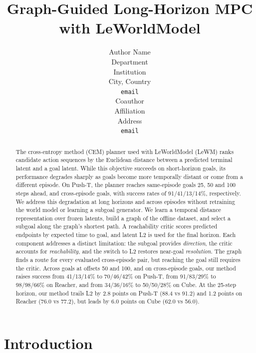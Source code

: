 \documentclass{article} %
\title{Graph-Guided Long-Horizon MPC with LeWorldModel}
\author{Author Name \\
Department \\
Institution \\
City, Country \\
\texttt{email} \\
\And
Coauthor \\
Affiliation \\
Address \\
\texttt{email}
}
\newcommand{\keypoints}[1]{\par\medskip\noindent\fcolorbox{black!50}{black!5}{\begin{minipage}{0.96\linewidth}\small
\textbf{Key points this section must land.}\begin{itemize}[nosep,leftmargin=1.2em]#1\end{itemize}\end{minipage}}\par\medskip}
\begin{document}
\maketitle

\begin{abstract}
The cross-entropy method (CEM) planner used with LeWorldModel (LeWM) ranks candidate action
sequences by the Euclidean distance between a predicted terminal latent and a goal latent. While
this objective succeeds on short-horizon goals, its performance degrades sharply as goals become
more temporally distant or come from a different episode. On Push-T, the planner reaches
same-episode goals 25, 50 and 100 steps ahead, and cross-episode goals, with success rates of
91/41/13/14\%, respectively. We address this degradation at long horizons and across episodes
without retraining the world model or learning a subgoal generator. We learn a temporal
distance representation over frozen latents, build a graph of the offline dataset, and select a subgoal along the graph's shortest path. A reachability critic scores predicted endpoints by expected time to goal, and latent L2 is used for the final horizon. Each component addresses a distinct limitation: the subgoal provides \emph{direction}, the critic accounts for \emph{reachability}, and the switch to L2 restores near-goal \emph{resolution}. The graph finds a route for every evaluated cross-episode pair, but reaching the goal still requires the critic.
Across goals at offsets 50 and 100, and on cross-episode goals, our method raises success from 41/13/14\% to 70/46/42\% on Push-T,
from 91/83/29\% to 98/98/66\% on Reacher, and from 34/36/16\% to 50/50/28\% on Cube. At the 25-step horizon, our method trails L2
by 2.8 points on Push-T (88.4 vs 91.2) and 1.2 points on Reacher (76.0 vs 77.2), but leads by 6.0 points on Cube (62.0 vs 56.0).
\end{abstract}

\section{Introduction}
\end{document}
